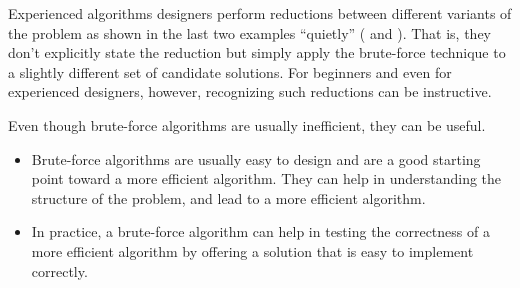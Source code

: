 \begin{remark}
Experienced algorithms designers  perform reductions between
different variants of the problem as shown in the last two examples
``quietly'' ( and
).
%
That is, they don't explicitly state the reduction but simply apply
the brute-force technique to a slightly different set of candidate
solutions.
%
For beginners and even for experienced designers, however, recognizing
such reductions can be instructive.
\end{remark}

\begin{remark}
Even though brute-force algorithms are usually inefficient, they can
be useful.
%
\begin{itemize}
\item Brute-force algorithms are usually easy to design and are a good starting point toward a more efficient algorithm.  They can help in   understanding the structure of the problem, and lead to a more efficient algorithm.

\item In practice, a brute-force algorithm can help in testing the correctness of   a more efficient algorithm by offering a solution that is easy to implement correctly.
%


\end{itemize}
\end{remark}






